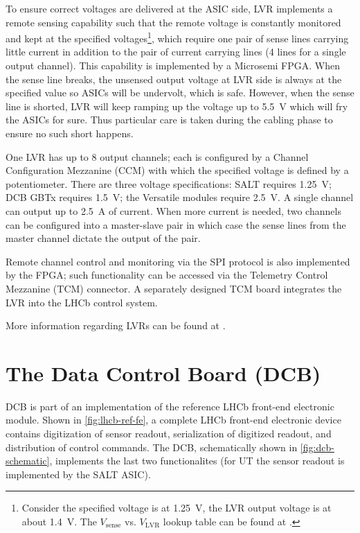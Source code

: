 To ensure correct voltages are delivered at the ASIC side,
LVR implements a remote sensing capability such that the remote voltage is
constantly monitored and kept at the specified voltages\footnote{
    Consider the specified voltage is at 1.25~V, the LVR output voltage is
    at about 1.4~V.
    The $V_\text{sense}$ vs. $V_\text{LVR}$ lookup table can be found at
    \cite{LVR_output_voltage_lookup}.
}, which require one
pair of sense lines carrying little current in addition to the pair of current
carrying lines (4 lines for a single output channel).
This capability is implemented by a Microsemi FPGA.
When the sense line breaks, the unsensed output voltage at LVR side is always
at the specified value so ASICs will be undervolt, which is safe.
However, when the sense line is shorted, LVR will keep ramping up the voltage
up to 5.5~V which will fry the ASICs for sure.
Thus particular care is taken during the cabling phase to ensure no such short
happens.

One LVR has up to 8 output channels; each is configured by a Channel
Configuration Mezzanine (CCM) with which the specified voltage is defined by a
potentiometer.
There are three voltage specifications: SALT requires 1.25~V; DCB GBTx requires
1.5~V; the Versatile modules require 2.5~V.
A single channel can output up to 2.5~A of current.
When more current is needed, two channels can be configured into a master-slave
pair in which case the sense lines from the master channel dictate the output
of the pair.

Remote channel control and monitoring via the SPI protocol is also implemented
by the FPGA;
such functionality can be accessed via the Telemetry Control Mezzanine (TCM)
connector.
A separately designed TCM board integrates the LVR into the LHCb control system.

More information regarding LVRs can be found at \cite{LVR_manual}.


\section{The Data Control Board (DCB)}
\label{ref:ut:dcb}

DCB is part of an implementation of the reference LHCb front-end  electronic
module.
Shown in \cref{fig:lhcb-ref-fe},
a complete LHCb front-end electronic device contains digitization of sensor
readout, serialization of digitized readout, and distribution of control
commands.
The DCB,
schematically shown in \cref{fig:dcb-schematic},
implements the last two functionalites (for UT the sensor readout is implemented
by the SALT ASIC).

